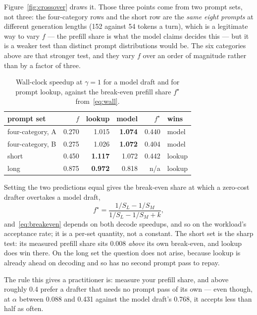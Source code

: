 \documentclass[conference]{IEEEtran}
\begin{document}
Figure~\ref{fig:crossover} draws it. Those three points come from two prompt sets, not three: the four-category rows and the short row are
the \emph{same eight prompts} at different generation lengths (152 against 54 tokens a turn), which
is a legitimate way to vary $f$ --- the prefill share is what the model claims decides this --- but it
is a weaker test than distinct prompt distributions would be. The six categories above are that
stronger test, and they vary $f$ over an order of magnitude rather than by a factor of three.

\begin{table}[t]
\caption{Wall-clock speedup at $\gamma=1$ for a model draft and for prompt lookup, against the
break-even prefill share $f^\star$ from~\eqref{eq:wall}.}
\label{tab:reversal}
\centering
\begin{tabular}{@{}lrrrrl@{}}
\toprule
prompt set & $f$ & lookup & model & $f^\star$ & wins \\
\midrule
four-category, A & 0.270 & 1.015 & \textbf{1.074} & 0.440 & model \\
four-category, B & 0.275 & 1.026 & \textbf{1.072} & 0.404 & model \\
short            & 0.450 & \textbf{1.117} & 1.072 & 0.442 & lookup \\
long             & 0.875 & \textbf{0.972} & 0.818 & n/a & lookup \\
\bottomrule
\end{tabular}
\end{table}

Setting the two predictions equal gives the break-even share at which a zero-cost drafter overtakes a
model draft,
\begin{equation}
f^\star = \frac{1/S_L - 1/S_M}{1/S_L - 1/S_M + k},
\label{eq:breakeven}
\end{equation}
and~\eqref{eq:breakeven} depends on both decode speedups, and so on the workload's acceptance rate;
it is a per-set quantity, not a constant. The short set is the sharp test: its measured prefill share sits 0.008
\emph{above} its own break-even, and lookup does win there. On the long set the question does not
arise, because lookup is already ahead on decoding and so has no second prompt pass to repay.

The rule this gives a practitioner is: measure your prefill share, and above roughly 0.4 prefer a
drafter that needs no prompt pass of its own --- even though, at $\alpha$ between 0.088 and 0.431
against the model draft's 0.768, it accepts less than half as often.
\end{document}
